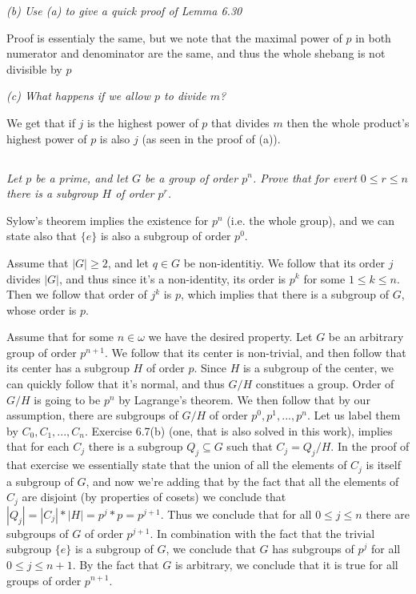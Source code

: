 \documentclass[11pt,oneside,titlepage]{book}
\newcommand{\set}[1]{\{ #1 \}}
\begin{document}
\textit{(b) Use (a) to give a quick proof of Lemma 6.30}

Proof is essentialy the same, but we note that the maximal power of
$p$ in both numerator and denominator are the same, and thus the whole
shebang is not divisible by $p$

\textit{(c) What happens if we allow $p$ to divide $m$?}

We get that if $j$ is the highest power of $p$ that divides $m$ then
the whole product's highest power of $p$ is also $j$ (as seen in the
proof of (a)).

\subsection{}

\textit{Let $p$ be a prime, and let $G$ be a group of order $p^n$. Prove
  that for evert $0 \leq r \leq n$ there is a subgroup $H$ of order $p^r$.}

Sylow's theorem implies the existence for $p^n$ (i.e. the whole group), and
we can state also that $\set{e}$ is also a subgroup of order $p^0$.

Assume that $|G| \geq 2$, and let $q \in G$ be non-identitiy. We
follow that its order $j$ divides $|G|$, and thus since it's a
non-identity, its order is $p^k$ for some $1 \leq k \leq n$. Then we
follow that order of $j^k$ is $p$, which implies that there is a
subgroup of $G$, whose order is $p$.

Assume that for some $n \in \omega$ we have the desired property.
Let $G$ be an arbitrary group of order $p^{n + 1}$. We follow that
its center is non-trivial, and then follow that its center has
a subgroup $H$ of order $p$. Since $H$ is a subgroup of the center,
we can quickly follow that it's normal, and thus $G/H$ constitues
a group. Order of $G/H$ is going to be $p^n$ by Lagrange's theorem. We
then follow that by our assumption, there are subgroups of $G/H$
of order $p^0, p^1, ..., p^n$. Let us label them by $C_0, C_1, ...,
C_n$. Exercise 6.7(b) (one, that is also solved in this work),
implies that for each $C_j$ there is a subgroup $Q_j \subseteq G$
such that $C_j = Q_j / H$. In the proof of that exercise we
essentially state that the union of all the elements of $C_j$ is
itself a subgroup of $G$, and now we're adding that by the fact that
all the elements of $C_j$ are disjoint (by properties of cosets) we
conclude that $|Q_j| = |C_j| * |H| = p^j * p = p^{j + 1}$. Thus we
conclude that for all $0 \leq j \leq n$ there are subgroups
of $G$ of order $p^{j + 1}$. In combination with the fact that
the trivial subgroup $\set{e}$ is a subgroup of $G$, we
conclude that $G$ has subgroups of $p^j$ for all $0 \leq j \leq n + 1$.
By the fact that $G$ is arbitrary, we conclude that it is true for
all groups of order $p^{n + 1}$.
\end{document}
